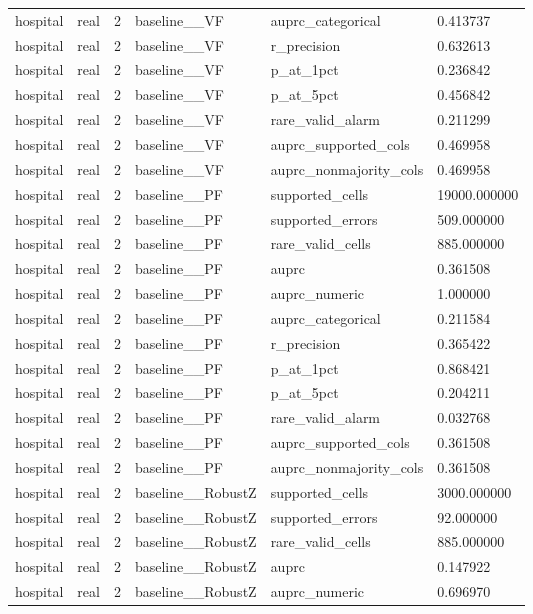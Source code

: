 \begin{tabular}{llllll}
hospital & real & 2 & baseline\_\_VF & auprc\_categorical & 0.413737 \\
hospital & real & 2 & baseline\_\_VF & r\_precision & 0.632613 \\
hospital & real & 2 & baseline\_\_VF & p\_at\_1pct & 0.236842 \\
hospital & real & 2 & baseline\_\_VF & p\_at\_5pct & 0.456842 \\
hospital & real & 2 & baseline\_\_VF & rare\_valid\_alarm & 0.211299 \\
hospital & real & 2 & baseline\_\_VF & auprc\_supported\_cols & 0.469958 \\
hospital & real & 2 & baseline\_\_VF & auprc\_nonmajority\_cols & 0.469958 \\
hospital & real & 2 & baseline\_\_PF & supported\_cells & 19000.000000 \\
hospital & real & 2 & baseline\_\_PF & supported\_errors & 509.000000 \\
hospital & real & 2 & baseline\_\_PF & rare\_valid\_cells & 885.000000 \\
hospital & real & 2 & baseline\_\_PF & auprc & 0.361508 \\
hospital & real & 2 & baseline\_\_PF & auprc\_numeric & 1.000000 \\
hospital & real & 2 & baseline\_\_PF & auprc\_categorical & 0.211584 \\
hospital & real & 2 & baseline\_\_PF & r\_precision & 0.365422 \\
hospital & real & 2 & baseline\_\_PF & p\_at\_1pct & 0.868421 \\
hospital & real & 2 & baseline\_\_PF & p\_at\_5pct & 0.204211 \\
hospital & real & 2 & baseline\_\_PF & rare\_valid\_alarm & 0.032768 \\
hospital & real & 2 & baseline\_\_PF & auprc\_supported\_cols & 0.361508 \\
hospital & real & 2 & baseline\_\_PF & auprc\_nonmajority\_cols & 0.361508 \\
hospital & real & 2 & baseline\_\_RobustZ & supported\_cells & 3000.000000 \\
hospital & real & 2 & baseline\_\_RobustZ & supported\_errors & 92.000000 \\
hospital & real & 2 & baseline\_\_RobustZ & rare\_valid\_cells & 885.000000 \\
hospital & real & 2 & baseline\_\_RobustZ & auprc & 0.147922 \\
hospital & real & 2 & baseline\_\_RobustZ & auprc\_numeric & 0.696970 \\

\end{tabular}

